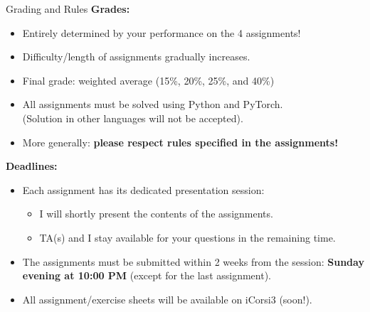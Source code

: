 \begin{frame}{Grading and Rules}
\vspace{-2mm}
\textbf{Grades:}
\begin{itemize}
\item Entirely determined by your performance on the \alert{4 assignments}!
\item Difficulty/length of assignments gradually increases.
\item Final grade: weighted average (15\%, 20\%, 25\%, and 40\%)
\item All assignments must be solved using Python and PyTorch.\\
(Solution in other languages will not be accepted).
\item More generally: \textbf{please respect rules specified in the assignments!}
\end{itemize}
\vsp
\pause
\textbf{Deadlines:}
\begin{itemize}
\item Each assignment has its dedicated presentation session:
\begin{itemize}
\item I will shortly present the contents of the assignments.
\item TA(s) and I stay available for your questions in the remaining time.
\end{itemize}
\item The assignments must be submitted \alert{within 2 weeks} from the session: \textbf{Sunday evening at 10:00 PM} (except for the last assignment).
\item All assignment/exercise sheets will be available on iCorsi3 (soon!).
\end{itemize}
\end{frame}

